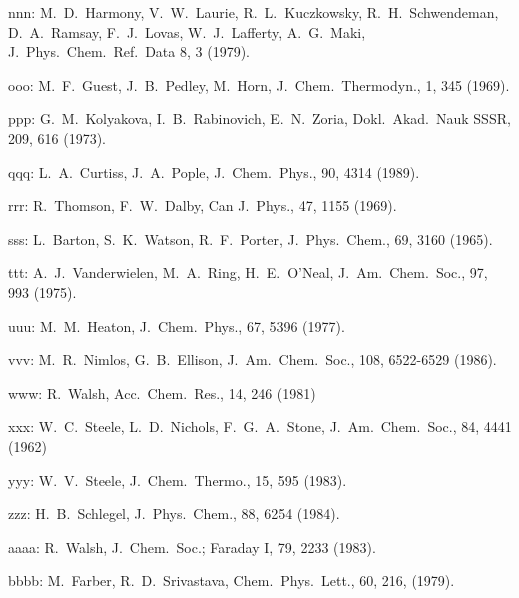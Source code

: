 \begin{description}
\item{ nnn: } M.\ D.\ Harmony, V.\ W.\ Laurie, R.\ L.\ Kuczkowsky, R.\ H.\ Schwendeman,
       D.\ A.\ Ramsay, F.\ J.\ Lovas, W.\ J.\ Lafferty, A.\ G.\ Maki, J.\ Phys.\
       Chem.\ Ref.\ Data 8, 3 (1979).
  
\item{ ooo: } M.\ F.\ Guest, J.\ B.\ Pedley, M.\ Horn, J.\ Chem.\ Thermodyn., 1, 345 (1969).
  
\item{ ppp: } G.\ M.\ Kolyakova, I.\ B.\ Rabinovich, E.\ N.\ Zoria, Dokl.\ Akad.\ Nauk
       SSSR, 209, 616 (1973).
  
\item{ qqq: } L.\ A.\ Curtiss, J.\ A.\ Pople, J.\ Chem.\ Phys., 90, 4314 (1989).
  
\item{ rrr: } R.\ Thomson, F.\ W.\ Dalby, Can J.\ Phys., 47, 1155 (1969).
  
\item{ sss: } L.\ Barton, S.\ K.\ Watson, R.\ F.\ Porter, J.\ Phys.\ Chem., 69, 3160 (1965).
  
\item{ ttt: }  A.\ J.\ Vanderwielen, M.\ A.\ Ring, H.\ E.\ O'Neal, J.\ Am.\ Chem.\ Soc., 97,
       993 (1975).
  
\item{ uuu: } M.\ M.\ Heaton, J.\ Chem.\ Phys., 67, 5396 (1977).
  
\item{ vvv: } M.\ R.\ Nimlos, G.\ B.\ Ellison, J.\ Am.\ Chem.\ Soc., 108, 6522-6529 (1986).
  
\item{ www: } R.\ Walsh, Acc.\ Chem.\ Res., 14, 246 (1981)
  
\item{ xxx: } W.\ C.\ Steele, L.\ D.\ Nichols, F.\ G.\ A.\ Stone, J.\ Am.\ Chem.\ Soc., 84,
       4441 (1962)
  
\item{ yyy: } W.\ V.\ Steele, J.\ Chem.\ Thermo., 15, 595 (1983).
  
\item{ zzz: } H.\ B.\ Schlegel, J.\ Phys.\ Chem., 88, 6254 (1984).
  
\item{aaaa: } R.\ Walsh, J.\ Chem.\ Soc.; Faraday I, 79, 2233 (1983).
  
\item{bbbb: } M.\ Farber, R.\ D.\ Srivastava, Chem.\ Phys.\ Lett., 60, 216, (1979).
  

\end{description}
